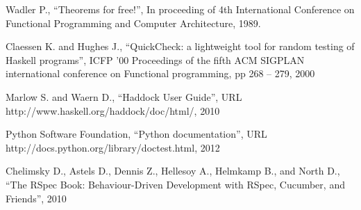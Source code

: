 \documentclass[preprint]{sigplanconf}
\begin{document}
\begin{thebibliography}{}
\softraggedright

Wadler P.,
``Theorems for free!'',
In proceeding of 4th International Conference on Functional Programming and Computer Architecture, 1989.

Claessen K. and Hughes J.,
``QuickCheck: a lightweight tool for random testing of Haskell programs'',
ICFP '00 Proceedings of the fifth ACM SIGPLAN international conference on Functional programming,
pp 268 -- 279,
2000

Marlow S. and Waern D.,
``Haddock User Guide'',
URL http://www.haskell.org/haddock/doc/html/,
2010

Python Software Foundation,
``Python documentation'',
URL http://docs.python.org/library/doctest.html,
2012

Chelimsky D.,
Astels D., Dennis Z., Hellesoy A., Helmkamp B., and North D.,
``The RSpec Book: Behaviour-Driven
Development with RSpec, Cucumber, and Friends'',
2010

\end{thebibliography}
\end{document}
